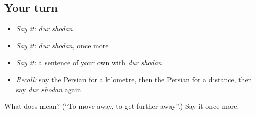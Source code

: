 \subsection*{Your turn}
\begin{itemize}
\raggedright
  \item \emph{Say it:} \emph{dur shodan}
  \item \emph{Say it:} \emph{dur shodan}, once more
  \item \emph{Say it:} a sentence of your own with \emph{dur shodan}
  \item \emph{Recall:} say the Persian for a kilometre, then the Persian for a distance, then say \emph{dur shodan} again
\end{itemize}

\begin{tcolorbox}[breakable,colback=teal!4,colframe=teal!35!black,title={Before you move on}]
What does   mean? (\textquotedblleft{}To move away, to get further away\textquotedblright{}.) Say it once more.
\end{tcolorbox}
